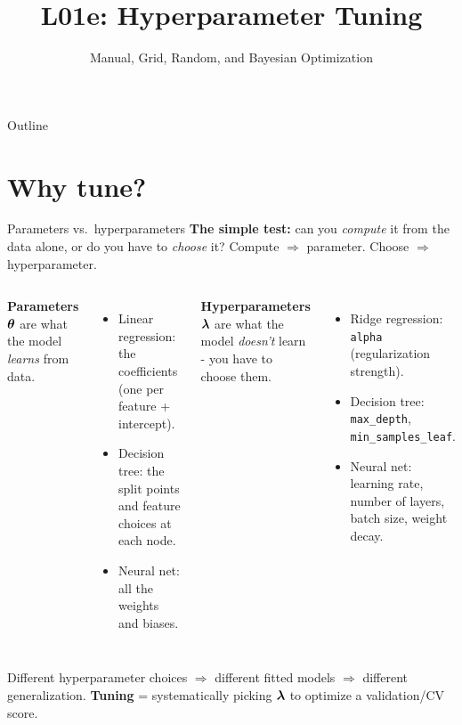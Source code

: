 \documentclass[aspectratio=169]{beamer}
\title{L01e: Hyperparameter Tuning}
\subtitle{Manual, Grid, Random, and Bayesian Optimization}
\date{}
\begin{document}
\begin{frame}{Outline}
  \tableofcontents
\end{frame}

\section{Why tune?}

\begin{frame}{Parameters vs.\ hyperparameters}
  \textbf{The simple test:} can you \emph{compute} it from the data alone, or do you have to \emph{choose} it? Compute $\Rightarrow$ parameter. Choose $\Rightarrow$ hyperparameter.
  \vfill
  \begin{columns}[T]
    \textbf{Parameters $\bm{\theta}$} are what the model \emph{learns} from data.
    \begin{itemize}\small
      \item Linear regression: the coefficients (one per feature + intercept).
      \item Decision tree: the split points and feature choices at each node.
      \item Neural net: all the weights and biases.
    \end{itemize}
    \textbf{Hyperparameters $\bm{\lambda}$} are what the model \emph{doesn't} learn - you have to choose them.
    \begin{itemize}\small
      \item Ridge regression: \texttt{alpha} (regularization strength).
      \item Decision tree: \texttt{max\_depth}, \texttt{min\_samples\_leaf}.
      \item Neural net: learning rate, number of layers, batch size, weight decay.
    \end{itemize}
  \end{columns}
  \vfill
  Different hyperparameter choices $\Rightarrow$ different fitted models $\Rightarrow$ different generalization. \textbf{Tuning} = systematically picking $\bm{\lambda}$ to optimize a validation/CV score.
\end{frame}
\end{document}
